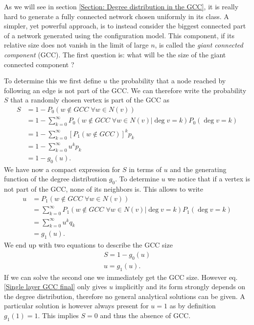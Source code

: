 \documentclass[
11pt, %
english, %
singlespacing, %
liststotoc, %
headsepline, %
]{MastersDoctoralThesis} %
\begin{document}
As we will see in section \ref{Section: Degree distribution in the GCC}, it is really hard to generate a fully connected network chosen uniformly in its class. A simpler, yet powerful approach, is to instead consider the biggest connected part of a network generated using the configuration model. This component, if its relative size does not vanish in the limit of large $n$, is called the \emph{giant connected component} (GCC). The first question is: what will be the size of the giant connected component ?

To determine this we first define $u$ the probability that a node reached by following an edge is not part of the GCC. We can therefore write the probability $S$ that a randomly chosen vertex is part of the GCC as
\begin{align}
	S 	&= 1 - P_0(w \notin GCC\; \forall w \in N(v))\\
		&= 1 - \sum_{k=0}^\infty P_0(w \notin GCC\; \forall w \in N(v)|\deg{v} = k) P_0(\deg{v} = k) \\
		&= 1 - \sum_{k=0}^\infty \left[P_1(w \notin GCC)\right]^k p_k \\
		&= 1 - \sum_{k=0}^\infty u^k p_k \\
		&= 1 - g_0(u).
\end{align}
We have now a compact expression for $S$ in terms of $u$ and the generating function of the degree distribution $g_0$. To determine $u$ we notice that if a vertex is not part of the GCC, none of its neighbors is. This allows to write
\begin{align}
	u 	&= P_1(w \notin GCC \; \forall w \in N(v)) \\
		&= \sum_{k=0}^\infty P_1(w \notin GCC \; \forall w \in N(v)| \deg{v} = k) P_1(\deg{v} = k) \\
		&= \sum_{k=0}^\infty u^k q_k \\
		&= g_1(u).
\end{align}
We end up with two equations to describe the GCC size
\begin{align}
	S = 1 - g_0(u) \label{Single layer GCC final} \\
	u = g_1(u). \label{Single layer u final}
\end{align}
If we can solve the second one we immediately get the GCC size. However eq. \eqref{Single layer GCC final} only gives $u$ implicitly and its form strongly depends on the degree distribution, therefore no general analytical solutions can be given. A particular solution is however always present for $u = 1$ as by definition  $g_1(1) = 1$. This implies $S = 0$ and thus the absence of GCC.
\end{document}
